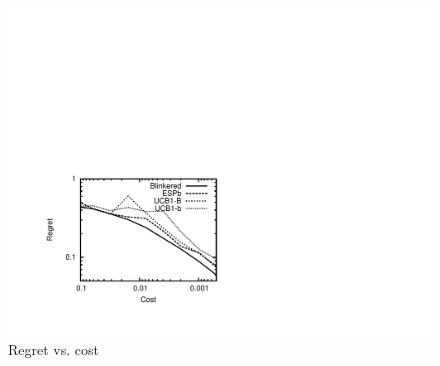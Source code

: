 
\begin{figure}[htb]
\centering
\includegraphics[scale=0.7, trim=90 70 400 300]{blinkered-regret.pdf}
\caption{Regret vs. cost}
\label{fig:blinkered}
\end{figure}

